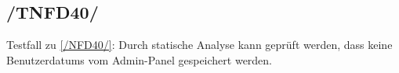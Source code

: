 \subsection*{/TNFD40/}
\label{/TNFD40/} Testfall zu \ref{/NFD40/}: Durch \gls{statische Analyse} kann geprüft werden, dass keine \Glspl{Benutzerdatum} vom \Gls{Admin-Panel} gespeichert werden.